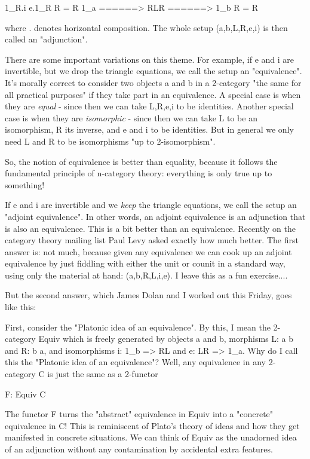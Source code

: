           1_{R}.i        e.1_{R}
R = R 1_{a} ======> RLR ======> 1_{b} R = R
$$
    

where . denotes horizontal composition.  The whole setup (a,b,L,R,e,i)
is then called an "adjunction".  


There are some important variations on this theme.  For example, if e
and i are invertible, but we drop the triangle equations, we call the
setup an "equivalence".  It's morally correct to consider two
objects a and b in a 2-category "the same for all practical
purposes" if they take part in an equivalence.  A special case is
when they are \emph{equal} - since then we can take L,R,e,i to be
identities.  Another special case is when they are \emph{isomorphic} -
since then we can take L to be an isomorphism, R its inverse, and e and
i to be identities.  But in general we only need L and R to be
isomorphisms "up to 2-isomorphism".

So, the notion of equivalence is better than equality, because it
follows the fundamental principle of n-category theory: everything is
only true up to something!


If e and i are invertible and we \emph{keep} the triangle equations,
we call the setup an "adjoint equivalence".  In other words,
an adjoint equivalence is an adjunction that is also an equivalence.
This is a bit better than an equivalence.  Recently on the category
theory mailing list Paul Levy asked exactly how much better.  The first
answer is: not much, because given any equivalence we can cook up an
adjoint equivalence by just fiddling with either the unit or counit in a
standard way, using only the material at hand: (a,b,R,L,i,e).  I leave
this as a fun exercise....

But the second answer, which James Dolan and I worked out this Friday,
goes like this:


First, consider the "Platonic idea of an equivalence".  By
this, I mean the 2-category Equiv which is freely generated by objects a
and b, morphisms L: a \to  b and R: b \to  a, and isomorphisms i:
1_{b} => RL and e: LR => 1_{a}.  Why do I call
this the "Platonic idea of an equivalence"?  Well, any
equivalence in any 2-category C is just the same as a 2-functor

F: Equiv \to  C

The functor F turns the "abstract" equivalence in Equiv into a
"concrete" equivalence in C!  This is reminiscent of Plato's theory
of ideas and how they get manifested in concrete situations.  We can
think of Equiv as the unadorned idea of an adjunction without any
contamination by accidental extra features.

